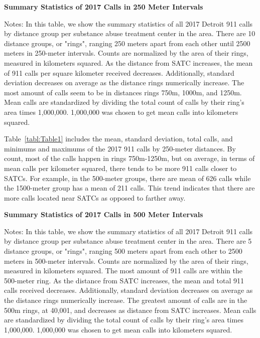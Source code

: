 \documentclass[12pt]{article}
\begin{document}
\begin{table}[H]
\centering
\scalebox{0.8}{
\centering

}
\caption{\textbf{Summary Statistics of 2017 Calls in 250 Meter Intervals}}
\label{tabl:Table1}
\centering\footnotesize{Notes: In this table, we show the summary statistics of all 2017 Detroit 911 calls by distance group per substance abuse treatment center in the area. There are 10 distance groups, or "rings", ranging 250 meters apart from each other until 2500 meters in 250-meter intervals. Counts are normalized by the area of their rings, measured in kilometers squared. As the distance from SATC increases, the mean of 911 calls per square kilometer received decreases. Additionally, standard deviation decreases on average as the distance rings numerically increase. The most amount of calls seem to be in distances rings 750m, 1000m, and 1250m. Mean calls are standardized by dividing the total count of calls by their ring's area times 1,000,000. 1,000,000 was chosen to get mean calls into kilometers squared.}
\end{table}  

Table~\ref{tabl:Table1} includes the mean, standard deviation, total calls, and minimums and maximums of the 2017 911 calls by 250-meter distances. By count, most of the calls happen in rings 750m-1250m, but on average, in terms of mean calls per kilometer squared, there tends to be more 911 calls closer to SATCs. For example, in the 500-meter groups, there are mean of 626 calls while the 1500-meter group has a mean of 211 calls. This trend indicates that there are more calls located near SATCs as opposed to farther away. 

\begin{table}[hb!]
\centering
\scalebox{0.8}{
\centering

}
\caption{\textbf{Summary Statistics of 2017 Calls in 500 Meter Intervals}}
\label{tabl:Table2}
\centering\footnotesize{Notes: In this table, we show the summary statistics of all 2017 Detroit 911 calls by distance group per substance abuse treatment center in the area. There are 5 distance groups, or "rings", ranging 500 meters apart from each other to 2500 meters in 500-meter intervals. Counts are normalized by the area of their rings, measured in kilometers squared. The most amount of 911 calls are within the 500-meter ring. As the distance from SATC increases, the mean and total 911 calls received decreases. Additionally, standard deviation decreases on average as the distance rings numerically increase. The greatest amount of calls are in the 500m rings, at 40,001, and decreases as distance from SATC increases. Mean calls are standardized by dividing the total count of calls by their ring's area times 1,000,000. 1,000,000 was chosen to get mean calls into kilometers squared. }
\end{table}
\end{document}

